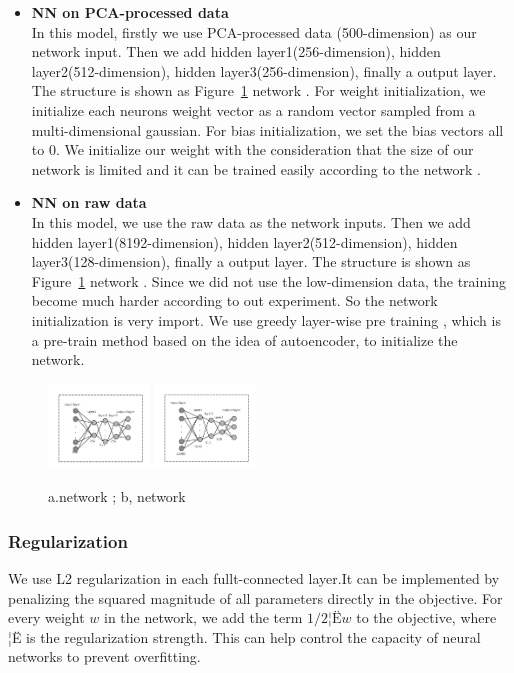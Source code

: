 \documentclass[sigconf]{acmart}
\begin{document}
\begin{itemize}
	\item \textbf{NN on PCA-processed data}\\
	In this model, firstly we use PCA-processed data (500-dimension) as our network input. Then we add hidden layer1(256-dimension), hidden layer2(512-dimension), hidden layer3(256-dimension), finally a output layer.  The structure is shown as Figure~\ref{nn_1} network . 
	For weight initialization, we initialize each neurons weight vector as a random vector sampled from a multi-dimensional gaussian. For bias initialization, we set the bias vectors all to $0$. We initialize our weight with the consideration that the size of our network is limited and it can be trained easily according to the network .
	
	\item \textbf{NN on raw data}\\
	In this model, we use the raw data as the network inputs. Then we add hidden layer1(8192-dimension), hidden layer2(512-dimension), hidden layer3(128-dimension), finally a output layer.  The structure is shown as Figure~\ref{nn_1} network . Since we did not use the low-dimension data, the training become much harder according to out experiment. So the network initialization is very import. We use greedy layer-wise pre training , which is a pre-train method based on the idea of autoencoder, to initialize the network. 
\end{itemize}

\begin{figure}[!ht]
	\centering
	\includegraphics[width=0.24\textwidth]{../figs/nn_pca.pdf}
	\includegraphics[width=0.24\textwidth]{../figs/nn_raw.pdf}
	\caption{a.network ;  b, network }
	\label{nn_1}
	\centering
\end{figure}

\subsubsection{Regularization}
We use L2 regularization in each fullt-connected layer.It can be implemented by penalizing the squared magnitude of all parameters directly in the objective. For every weight $w$ in the network, we add the term $1/2¦Ëw$ to the objective, where ¦Ë is the regularization strength. This can help control the capacity of neural networks to prevent overfitting.
\end{document}
